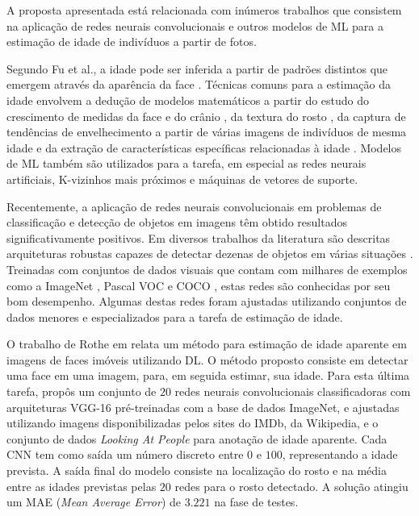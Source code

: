 
A proposta apresentada está relacionada com inúmeros trabalhos que consistem na aplicação de redes neurais convolucionais e outros modelos de ML para a estimação de idade de indivíduos a partir de fotos.

Segundo Fu et al., a idade pode ser inferida a partir de padrões distintos que emergem através da aparência da face \cite{fu2010age}. Técnicas comuns para a estimação da idade envolvem a dedução de modelos matemáticos a partir do estudo do crescimento de medidas da face e do crânio \cite{kwon1999age}, da textura do rosto \cite{lanitis2002toward}, da captura de tendências de envelhecimento a partir de várias imagens de indivíduos de mesma idade \cite{fu2007estimating} e da extração de características específicas relacionadas à idade \cite{suo2008design, lou2018expression}. Modelos de ML também são utilizados para a tarefa, em especial as redes neurais artificiais, K-vizinhos mais próximos e máquinas de vetores de suporte.

Recentemente, a aplicação de redes neurais convolucionais em problemas de classificação e detecção de objetos em imagens têm obtido resultados significativamente positivos. Em  diversos trabalhos da literatura são descritas arquiteturas robustas capazes de detectar dezenas de objetos em várias situações \cite{vggnet, resnet, inception, redmon2016you, ssd}. Treinadas com conjuntos de dados visuais que contam com milhares de exemplos como a ImageNet \cite{ImagenetChall}, Pascal VOC \cite{pascalvoc} e COCO \cite{coco}, estas redes são conhecidas por seu bom desempenho. Algumas destas redes foram ajustadas utilizando conjuntos de dados menores e especializados para a tarefa de estimação de idade.

O trabalho de Rothe em \cite{rothe2015dex} relata um método para estimação de idade aparente em imagens de faces imóveis utilizando DL. O método proposto consiste em detectar uma face em uma imagem, para, em seguida estimar, sua idade. Para esta última tarefa, propôs um conjunto de $20$ redes neurais convolucionais classificadoras com arquiteturas VGG-16 pré-treinadas com a base de dados ImageNet, e ajustadas utilizando imagens disponibilizadas pelos sites do IMDb, da Wikipedia, e o conjunto de dados \emph{Looking At People} para anotação de idade aparente. Cada CNN tem como saída um número discreto entre $0$ e $100$, representando a idade prevista. A saída final do modelo consiste na localização do rosto e na média entre as idades previstas pelas $20$ redes para o rosto detectado. A solução atingiu um MAE (\emph{Mean Average Error}) de $3.221$ na fase de testes.

